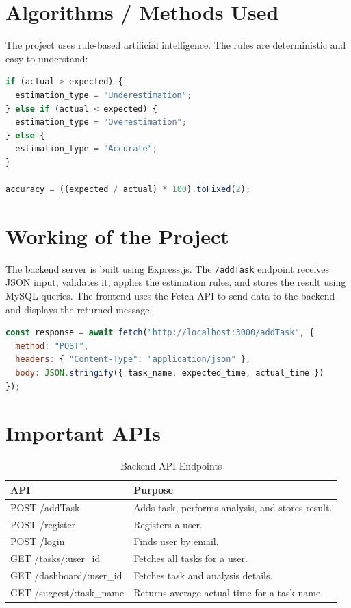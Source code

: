 \section{Algorithms / Methods Used}
\begin{justify}
The project uses rule-based artificial intelligence. The rules are deterministic and easy to understand:
\end{justify}

\begin{lstlisting}[language=JavaScript,caption={Rule-based estimation logic}]
if (actual > expected) {
  estimation_type = "Underestimation";
} else if (actual < expected) {
  estimation_type = "Overestimation";
} else {
  estimation_type = "Accurate";
}

accuracy = ((expected / actual) * 100).toFixed(2);
\end{lstlisting}

\section{Working of the Project}
\begin{justify}
The backend server is built using Express.js. The \texttt{/addTask} endpoint receives JSON input, validates it, applies the estimation rules, and stores the result using MySQL queries. The frontend uses the Fetch API to send data to the backend and displays the returned message.
\end{justify}

\begin{lstlisting}[language=JavaScript,caption={Frontend API call}]
const response = await fetch("http://localhost:3000/addTask", {
  method: "POST",
  headers: { "Content-Type": "application/json" },
  body: JSON.stringify({ task_name, expected_time, actual_time })
});
\end{lstlisting}

\section{Important APIs}
\begin{table}[H]
\centering
\begin{tabular}{|M|L|}
\hline
\textbf{API} & \textbf{Purpose} \\
\hline
POST /addTask & Adds task, performs analysis, and stores result. \\
\hline
POST /register & Registers a user. \\
\hline
POST /login & Finds user by email. \\
\hline
GET /tasks/:user\_id & Fetches all tasks for a user. \\
\hline
GET /dashboard/:user\_id & Fetches task and analysis details. \\
\hline
GET /suggest/:task\_name & Returns average actual time for a task name. \\
\hline
\end{tabular}
\caption{Backend API Endpoints}
\end{table}
